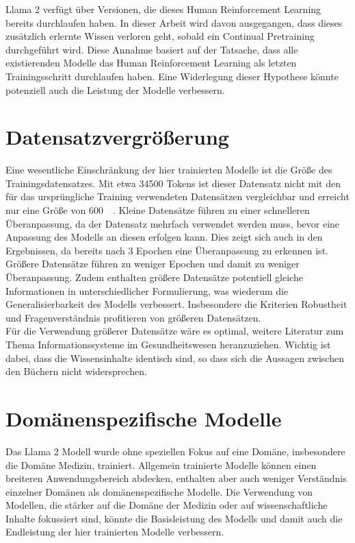 Llama 2 verfügt über Versionen, die dieses Human Reinforcement Learning bereits durchlaufen haben.
In dieser Arbeit wird davon ausgegangen, dass dieses zusätzlich erlernte Wissen verloren geht, sobald ein Continual Pretraining durchgeführt wird.
Diese Annahme basiert auf der Tatsache, dass alle existierenden Modelle das Human Reinforcement Learning als letzten Trainingsschritt durchlaufen haben.
Eine Widerlegung dieser Hypothese könnte potenziell auch die Leistung der Modelle verbessern.

\section{Datensatzvergrößerung}
Eine wesentliche Einschränkung der hier trainierten Modelle ist die Größe des Trainingsdatensatzes.
Mit etwa \num{34500} Tokens ist dieser Datensatz nicht mit den für das ursprüngliche Training verwendeten Datensätzen vergleichbar und erreicht nur eine Größe von \SI{600}{\kilo\byte}. Kleine Datensätze führen zu einer schnelleren Überanpassung, da der Datensatz mehrfach verwendet werden muss, bevor eine Anpassung des Modells an diesen erfolgen kann.
Dies zeigt sich auch in den Ergebnissen, da bereits nach 3 Epochen eine Überanpassung zu erkennen ist.
Größere Datensätze führen zu weniger Epochen und damit zu weniger Überanpassung.
Zudem enthalten größere Datensätze potentiell gleiche Informationen in unterschiedlicher Formulierung, was wiederum die Generalisierbarkeit des Modells verbessert.
Insbesondere die Kriterien Robustheit und Fragenverständnis profitieren von größeren Datensätzen.\\

Für die Verwendung größerer Datensätze wäre es optimal, weitere Literatur zum Thema Informationssysteme im Gesundheitswesen heranzuziehen.
Wichtig ist dabei, dass die Wissensinhalte identisch sind, so dass sich die Aussagen zwischen den Büchern nicht widersprechen.

\section{Domänenspezifische Modelle}
Das Llama 2 Modell wurde ohne speziellen Fokus auf eine Domäne, insbesondere die Domäne Medizin, trainiert.
Allgemein trainierte Modelle können einen breiteren Anwendungsbereich abdecken, enthalten aber auch weniger Verständnis einzelner Domänen als domänenspezifische Modelle.
Die Verwendung von Modellen, die stärker auf die Domäne der Medizin oder auf wissenschaftliche Inhalte fokussiert sind, könnte die Basisleistung des Modells und damit auch die Endleistung der hier trainierten Modelle verbessern.\\


